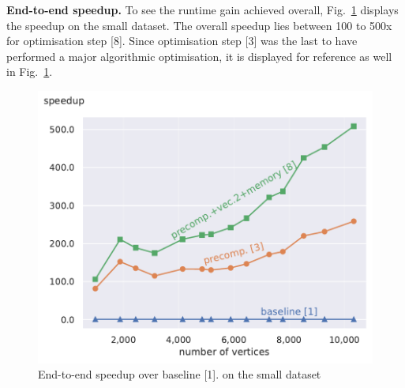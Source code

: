 \documentclass[letterpaper]{article}
\newcommand{\mypar}[1]{{\bf #1.}}
\begin{document}
\mypar{End-to-end speedup} To see the runtime gain achieved overall, Fig.~\ref{speedupEndToEndSmall} displays the speedup on the small dataset.
The overall speedup lies between 100 to 500x for optimisation step [8].
Since optimisation step [3] was the last to have performed a major algorithmic optimisation, it is displayed for reference as well in Fig.~\ref{speedupEndToEndSmall}.
\begin{figure}\centering
	\includegraphics[scale=0.56]{img/speedup[1][3][8]_small.pdf}
	\caption{End-to-end speedup over baseline [1]. on the small dataset} \label{speedupEndToEndSmall}
\end{figure}




\end{document}
